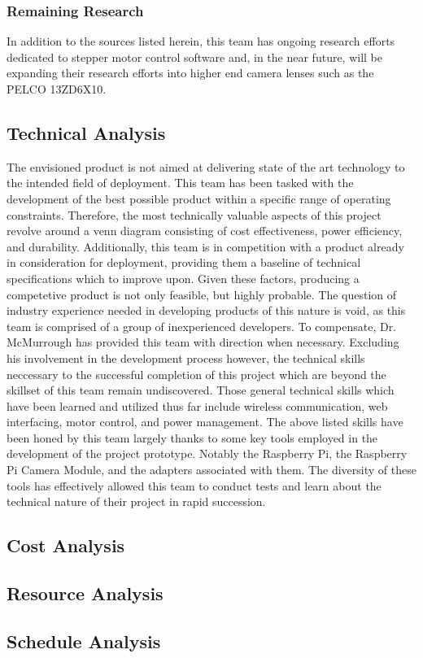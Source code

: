 \subsubsection{Remaining Research}
In addition to the sources listed herein, this team has ongoing research efforts dedicated to stepper motor control software and, in the near future, will be expanding their research efforts into higher end camera lenses such as the PELCO 13ZD6X10.
\subsection{Technical Analysis}
The envisioned product is not aimed at delivering state of the art technology to the intended field of deployment. This team has been tasked with the development of the best possible product within a specific range of operating constraints. Therefore, the most technically valuable aspects of this project revolve around a venn diagram consisting of cost effectiveness, power efficiency, and durability. Additionally, this team is in competition with a product already in consideration for deployment, providing them a baseline of technical specifications which to improve upon. Given these factors, producing a competetive product is not only feasible, but highly probable.
The question of industry experience needed in developing products of this nature is void, as this team is comprised of a group of inexperienced developers. To compensate, Dr. McMurrough has provided this team with direction when necessary. Excluding his involvement in the development process however, the technical skills neccessary to the successful completion of this project which are beyond the skillset of this team remain undiscovered. Those general technical skills which have been learned and utilized thus far include wireless communication, web interfacing, motor control, and power management.
The above listed skills have been honed by this team largely thanks to some key tools employed in the development of the project prototype. Notably the Raspberry Pi, the Raspberry Pi Camera Module, and the adapters associated with them. The diversity of these tools has effectively allowed this team to conduct tests and learn about the technical nature of their project in rapid succession.  
\subsection{Cost Analysis}

\subsection{Resource Analysis}

\subsection{Schedule Analysis}
